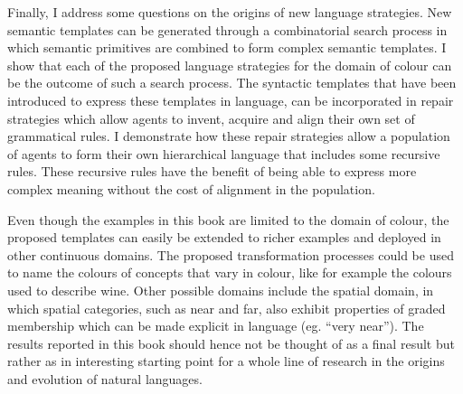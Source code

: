 Finally, I address some questions on the origins of new language
strategies. New semantic templates can be generated through a
combinatorial search process in which semantic primitives are combined
to form complex semantic templates. I show that each of the proposed
language strategies for the domain of colour can be the outcome of
such a search process. The syntactic templates that have been
introduced to express these templates in language, can be incorporated
in repair strategies which allow agents to invent, acquire and align
their own set of grammatical rules. I demonstrate how these repair
strategies allow a population of agents to form their own hierarchical
language that includes some recursive rules. These recursive rules
have the benefit of being able to express more complex meaning without
the cost of alignment in the population.

Even though the examples in this book are limited to the domain of
colour, the proposed templates can easily be extended to richer
examples and deployed in other continuous domains. The proposed
transformation processes could be used to name the colours of concepts
that vary in colour, like for example the colours used to describe
wine. Other possible domains include the spatial domain, in which
spatial categories, such as near and far, also exhibit properties of
graded membership which can be made explicit in language (eg. ``very
near'').  The results reported in this book should hence not be
thought of as a final result but rather as in interesting starting
point for a whole line of research in the origins and evolution of
natural languages.